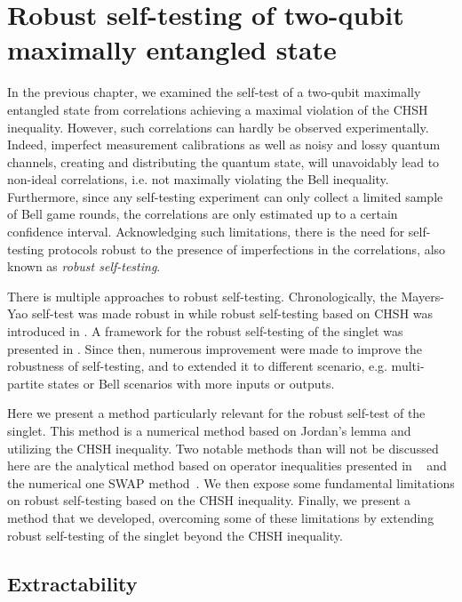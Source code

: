 \chapter{Robust self-testing of two-qubit maximally entangled state}

In the previous chapter, we examined the self-test of a two-qubit maximally entangled state from correlations achieving a maximal violation of the CHSH inequality.
However, such correlations can hardly be observed experimentally. 
Indeed, imperfect measurement calibrations as well as noisy and lossy quantum channels, creating and distributing the quantum state, will unavoidably lead to non-ideal correlations, i.e. not maximally violating the Bell inequality.
Furthermore, since any self-testing experiment can only collect a limited sample of Bell game rounds, the correlations are only estimated up to a certain confidence interval. 
Acknowledging such limitations, there is the need for self-testing protocols robust to the presence of imperfections in the correlations, also known as \textit{robust self-testing}.

There is multiple approaches to robust self-testing. 
Chronologically, the Mayers-Yao self-test was made robust in \cite{Magniez2006} while robust self-testing based on CHSH was introduced in \cite{Bardyn2009}.
A framework for the robust self-testing of the singlet was presented in \cite{McKague2012}.
Since then, numerous improvement were made to improve the robustness of self-testing, and to extended it to different scenario, e.g. multi-partite states or Bell scenarios with more inputs or outputs.

Here we present a method particularly relevant for the robust self-test of the singlet. 
This method is a numerical method based on Jordan's lemma and utilizing the CHSH inequality. 
Two notable methods than will not be discussed here are the analytical method based on operator inequalities presented in ~\cite{Kaniewski2016} and the numerical one SWAP method~\cite{Bancal2015}.
We then expose some fundamental limitations on robust self-testing based on the CHSH inequality.
Finally, we present a method that we developed, overcoming some of these limitations by extending robust self-testing of the singlet beyond the CHSH inequality.

\section{Extractability}

